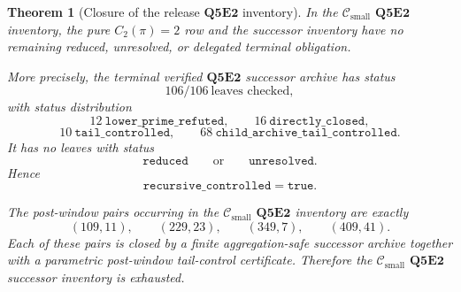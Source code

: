 \documentclass[11pt]{article}
\newtheorem{theorem}{Theorem}[section]
\theoremstyle{definition}
\theoremstyle{remark}
\newcommand{\Csmall}{\ensuremath{\mathcal C_{\mathrm{small}}}}
\begin{document}
\begin{theorem}[Closure of the release \texorpdfstring{\(\mathbf{Q5E2}\)}{Q5E2} inventory]
\label{thm:q5e2-current-successor-inventory-closed}
In the \(\Csmall\) \(\mathbf{Q5E2}\) inventory, the pure \(C_2(\pi)=2\) row and
the successor inventory have no remaining reduced, unresolved, or delegated
terminal obligation.

More precisely, the terminal verified \(\mathbf{Q5E2}\) successor archive has
status
\[
  106/106\ \text{leaves checked},
\]
with status distribution
\[
  12\ \mathtt{lower\_prime\_refuted},
  \qquad
  16\ \mathtt{directly\_closed},
\]
\[
  10\ \mathtt{tail\_controlled},
  \qquad
  68\ \mathtt{child\_archive\_tail\_controlled}.
\]
It has no leaves with status
\[
  \mathtt{reduced}
  \qquad\text{or}\qquad
  \mathtt{unresolved}.
\]
Hence
\[
  \mathtt{recursive\_controlled}=\mathtt{true}.
\]

The post-window pairs occurring in the \(\Csmall\) \(\mathbf{Q5E2}\) inventory are
exactly
\[
  (109,11),
  \qquad
  (229,23),
  \qquad
  (349,7),
  \qquad
  (409,41).
\]
Each of these pairs is closed by a finite aggregation-safe successor archive
together with a parametric post-window tail-control certificate.  Therefore the
\(\Csmall\) \(\mathbf{Q5E2}\) successor inventory is exhausted.
\end{theorem}
\end{document}
